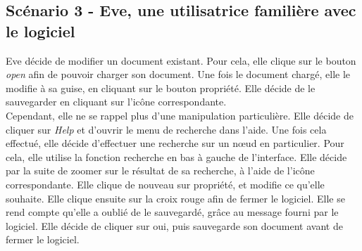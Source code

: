 \documentclass[12pt, a4paper]{article}
\begin{document}
\subsection{Scénario 3 - Eve, une utilisatrice familière avec le logiciel}


Eve décide de modifier un document existant. Pour cela, elle clique sur le bouton \emph{open} afin de pouvoir charger son document. Une fois le document chargé, elle le modifie à sa guise, en cliquant sur le bouton propriété. Elle décide de le sauvegarder en cliquant sur l'icône correspondante.\\


Cependant, elle ne se rappel plus d'une manipulation particulière. Elle décide de cliquer sur \emph{Help} et d'ouvrir le menu de recherche dans l'aide. Une fois cela effectué, elle décide d’effectuer une recherche sur un nœud en particulier. Pour cela, elle utilise la fonction recherche en bas à gauche de l'interface. Elle décide par la suite de zoomer sur le résultat de sa recherche, à l'aide de l'icône correspondante. Elle clique de nouveau sur propriété, et modifie ce qu'elle souhaite. Elle clique ensuite sur la croix rouge afin de fermer le logiciel. Elle se rend compte qu'elle a oublié de le sauvegardé, grâce au message fourni par le logiciel. Elle décide de cliquer sur oui, puis sauvegarde son document avant de fermer le logiciel.
\end{document}

